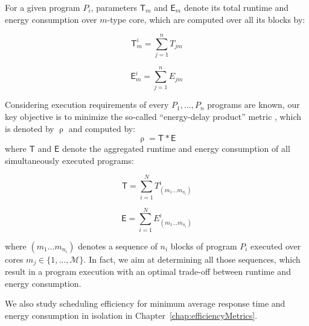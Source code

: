 For a given program $P_i$, parameters $\mathsf{T}_m$ and $\mathsf{E}_m$ denote its total runtime and energy consumption over $m$-type core, which are computed over all its blocks by:
%
\begin{minipage}{0.46\columnwidth}
\smallskip
\begin{equation}
\mathsf{T}^i_m=\sum_{j=1}^{n}{T_{jm}}
\end{equation}
\smallskip
\end{minipage}%
\begin{minipage}{.5\columnwidth}
\smallskip
\begin{equation}
\mathsf{E}^i_m=\sum_{j=1}^{n}{E_{jm}}
\end{equation}
\smallskip
\end{minipage}


Considering execution requirements of every $P_1,\ldots,P_n$ programs are known, our key objective is to minimize the so-called ``energy-delay product'' metric \cite{Ratkovic2015}, which is denoted by $\uprho$ and computed by:
%
\begin{equation}
\uprho = \mathsf{T} * \mathsf{E}
\end{equation}
%
where $\mathsf{T}$ and $\mathsf{E}$ denote the aggregated runtime and energy consumption of all simultaneously executed programs:

\begin{minipage}{0.4\columnwidth}
\smallskip
\begin{equation}
\mathsf{T}=\sum_{i=1}^N{T^i_{\left(m_1\dots m_{n_i}\right)}}
\end{equation}
\smallskip
\end{minipage}%
\begin{minipage}{.4\columnwidth}
\smallskip
\begin{equation}
\mathsf{E}=\sum_{i=1}^N{E^i_{\left(m_1\dots m_{n_i}\right)}}
\end{equation}
\smallskip
\end{minipage}

where $\left(m_1\dots m_{n_i}\right)$ denotes a sequence of $n_i$ blocks of program $P_i$ executed over cores $m_j\in \{1,\ldots, \mathcal{M}\}$. In fact, we aim at determining all those sequences, which result in a program execution with an optimal trade-off between runtime and energy consumption.

We also study scheduling efficiency for minimum average response time and energy consumption in isolation in Chapter~\ref{chap:efficiencyMetrics}.

